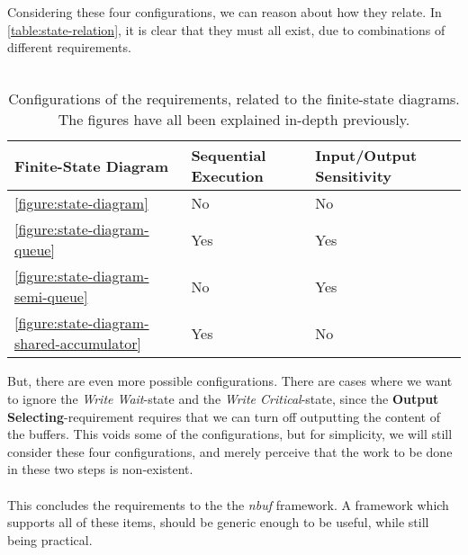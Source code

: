 \documentclass[a4paper]{article}
\newcommand{\nbuf}{\textit{nbuf} }
\begin{document}
Considering these four configurations, we can reason about how they relate. In \autoref{table:state-relation}, it is clear that they must all exist, due to combinations of different requirements.\\\\

\begin{table}[]
\begin{adjustwidth}{-0.5in}{-0.5in}
\centering
\begin{tabular}{@{}lll@{}}
\toprule
\textbf{Finite-State Diagram}                     & \textbf{Sequential Execution} & \textbf{Input/Output Sensitivity} \\ \midrule
\autoref{figure:state-diagram}                    & No                            & No                                \\ \midrule
\autoref{figure:state-diagram-queue}              & Yes                           & Yes                               \\ \midrule
\autoref{figure:state-diagram-semi-queue}         & No                            & Yes                               \\ \midrule
\autoref{figure:state-diagram-shared-accumulator} & Yes                           & No                                \\ \bottomrule
\end{tabular}
\caption{Configurations of the requirements, related to the finite-state diagrams. The figures have all been explained in-depth previously.}
\label{table:state-relation}
\end{adjustwidth}
\end{table}


But, there are even more possible configurations. There are cases where we want to ignore the \textit{Write Wait}-state and the \textit{Write Critical}-state, since the \textbf{Output Selecting}-requirement requires that we can turn off outputting the content of the buffers. This voids some of the configurations, but for simplicity, we will still consider these four configurations, and merely perceive that the work to be done in these two steps is non-existent.\\\\

This concludes the requirements to the the \nbuf framework. A framework which supports all of these items, should be generic enough to be useful, while still being practical.

\newpage
\end{document}
